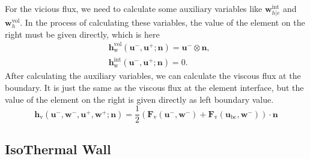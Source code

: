 \documentclass{develop-note}
\begin{document}
For the vicious flux, we need to calculate some auxiliary variables like $\mathbf{w}_{h|e}^{\mathrm{int}}$ and $\mathbf{w}_{h}^{\mathrm{vol}}$. In the process of calculating these variables, the value of the element on the right must be given directly, which is here
\begin{equation}
  \begin{aligned}
  &\mathbf{h}^{\mathrm{vol}}_{\mathrm{w}}(\mathbf{u}^{-},\mathbf{u}^{+};\mathbf{n})=\mathbf{u}^{-}\otimes\mathbf{n},\\
  &\mathbf{h}^{\mathrm{int}}_{\mathrm{w}}(\mathbf{u}^{-},\mathbf{u}^{+};\mathbf{n})=0.
  \end{aligned}
\end{equation}
After calculating the auxiliary variables, we can calculate the viscous flux at the boundary. It is just the same as the viscous flux at the element interface, but the value of the element on the right is given directly as left boundary value.
\begin{equation}
  \mathbf{h}_{\mathrm{v}}(\mathbf{u}^{-},\mathbf{w}^{-},\mathbf{u}^{+},\mathbf{w}^{+};\mathbf{n})=\dfrac{1}{2}(\mathbf{F}_{\mathrm{v}}(\mathbf{u}^{-},\mathbf{w}^{-})+\mathbf{F}_{\mathrm{v}}(\mathbf{u}_\mathrm{bc},\mathbf{w}^{-}))\cdot\mathbf{n}
\end{equation}

\subsection*{IsoThermal Wall}
\end{document}
